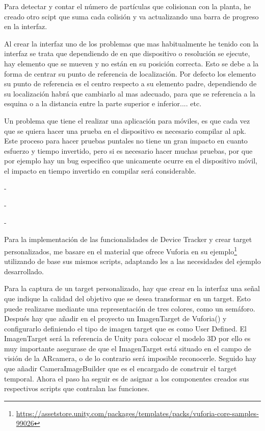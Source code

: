 Para detectar y contar el número de partículas que colisionan con la planta, he creado otro scipt que suma cada colisión y va actualizando una barra de progreso en la interfaz.


Al crear la interfaz uno de los problemas que mas habitualmente he tenido con la interfaz se trata que dependiendo de en que dispositivo o resolución se ejecute, hay elemento que se mueven y no están en su posición correcta. Esto se debe a la forma de centrar su punto de referencia de localización. Por defecto los elemento su punto de referencia es el centro respecto a su elemento padre, dependiendo de su localización habrá que cambiarlo al mas adecuado, para que se referencia a la esquina o a la distancia entre la parte superior e inferior.... etc.



Un problema que tiene el realizar una aplicación para móviles, es que cada vez que se quiera hacer una prueba en el dispositivo es necesario compilar al apk. Este proceso para hacer pruebas puntales no tiene un gran impacto en cuanto esfuerzo y tiempo invertido, pero si es necesario hacer muchas pruebas, por que por ejemplo hay un bug especifico que unicamente ocurre en el dispositivo móvil, el impacto en tiempo invertido en compilar será considerable.


-

-

-

Para la implementación de las funcionalidades de Device Tracker y crear target personalizados, me basare en el material que ofrece Vuforia en su ejemplo\footnote{\url{https://assetstore.unity.com/packages/templates/packs/vuforia-core-samples-99026}} utilizando de base sus mismos scripts, adaptando les a las necesidades del ejemplo desarrollado.

Para la captura de un target personalizado, hay que crear en la interfaz una señal que indique la calidad del objetivo que se desea transformar en un target.
Esto puede realizarse mediante una representación de tres colores, como un semáforo.
Después hay que añadir en el proyecto un ImagenTarget de Vuforia() y configurarlo definiendo el tipo de imagen target que es como User Defined. El ImagenTarget será la referencia de Unity para colocar el modelo 3D por ello es muy importante asegurase de que el ImagenTarget está situado en el campo de visión de la ARcamera, o de lo contrario será imposible reconocerle. 
Seguido hay que añadir CameraImageBuilder que es el encargado de construir el target temporal. 
Ahora el paso ha seguir es de asignar a los componentes creados sus respectivos scripts que contralan las funciones. 

